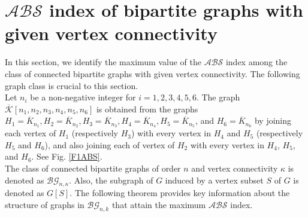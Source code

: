 \documentclass[12pt]{article}
\begin{document}
\section{$\mathcal{ABS}$ index of bipartite graphs with given vertex connectivity}\label{given3}
In this section, we identify the maximum value of the $\mathcal{ABS}$ index among the class of connected bipartite graphs with given vertex connectivity. The following graph class is crucial to this section.\\[2mm]
Let $n_{i}$ be a non-negative integer for $i=1,2,3,4,5,6$.  The graph $\overline{\mathcal{K}}[n_{1},n_{2},n_{3},n_{4},n_{5},n_{6}]$ is obtained from the graphs $H_{1}=\overline{K}_{n_{1}}, H_{2}=\overline{K}_{n_{2}}, H_{3}=\overline{K}_{n_{3}}, H_{4}=\overline{K}_{n_{4}}, H_{5}=\overline{K}_{n_{5}}$, and $H_{6}=\overline{K}_{n_{6}}$ by joining each vertex of $H_{1}$ (respectively $H_{3}$) with every vertex in $H_{4}$ and $H_{5}$ (respectively $H_{5}$ and $H_{6}$), and also joining each of vertex of $H_{2}$ with every vertex in $H_{4}$, $H_{5}$, and $H_{6}$. See Fig. \ref{F1ABS}.\\
The class of connected bipartite graphs of order $n$ and vertex connectivity $\kappa$ is denoted as $\mathcal{BG}_{n,\kappa}$. Also, the subgraph of $G$ induced by a vertex subset $S$ of $G$ is denoted as $G[S]$. The following theorem provides key information about the structure of  graphs in $\mathcal{BG}_{n,k}$ that attain the maximum $\mathcal{ABS}$ index.
\end{document}
